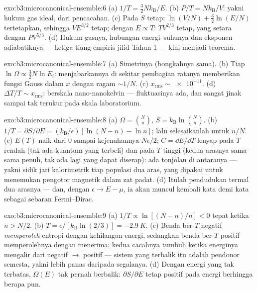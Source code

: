 \begin{solution}{exo:b3:microcanonical-ensemble:6}
(a) $1/T = \tfrac32 Nk_{\text{B}}/E$. (b) $P/T =
Nk_{\text{B}}/V$: yakni hukum gas ideal, dari pencacahan. (c) Pada $S$
tetap: $\ln(V/N) + \tfrac32\ln(E/N)$ tertetapkan, sehingga $VE^{3/2}$
tetap; dengan $E \propto T$: $TV^{2/3}$ tetap, yang setara dengan
$PV^{5/3}$. (d) Hukum gasnya, hubungan energi--suhunya dan eksponen
adiabatiknya --- ketiga tiang empiris jilid Tahun 1 --- kini menjadi
teorema.
\end{solution}

\begin{solution}{exo:b3:microcanonical-ensemble:7}
(a) Simetrinya (bongkahnya sama). (b) Tiap $\ln\Omega \propto
\tfrac32 N\ln E_i$: menjabarkannya di sekitar pembagian ratanya
memberikan fungsi Gauss dalam $x$ dengan ragam $\sim1/N$. (c) $x_{\text{rms}} \sim
\num{e-11}$. (d) $\Delta T/T \sim x_{\text{rms}}$:
berskala nano-nanokelvin --- fluktuasinya ada, dan sangat jinak sampai
tak terukur pada skala laboratorium.
\end{solution}

\begin{solution}{exo:b3:microcanonical-ensemble:8}
(a) $\Omega = \binom Nn$, $S = k_{\text{B}}\ln\binom Nn$. (b)
$1/T = \partial S/\partial E = (k_{\text{B}}/\epsilon)[\ln(N-n) -
\ln n]$; lalu selesaikanlah untuk $n/N$. (c) $E(T)$ naik dari $0$ sampai
kejenuhannya $N\epsilon/2$; $C = \dd E/\dd T$ lenyap pada $T$ rendah
(tak ada kuantum yang terbeli) dan pada $T$ tinggi (kedua arasnya
sama-sama penuh, tak ada lagi yang dapat diserap): ada tonjolan di
antaranya --- yakni sidik jari kalorimetrik tiap populasi dua aras, yang
dipakai untuk menemukan pengotor magnetik dalam zat padat. (d) Itulah
pendudukan termal dua arasnya --- dan, dengan $\epsilon \to E - \mu$, ia
akan muncul kembali kata demi kata sebagai sebaran Fermi--Dirac.
\end{solution}

\begin{solution}{exo:b3:microcanonical-ensemble:9}
(a) $1/T \propto \ln[(N-n)/n] < 0$ tepat ketika $n > N/2$. (b)
$T = \epsilon/[k_{\text{B}}\ln(2/3)] = -\qty{2.9}{K}$. (c) Benda ber-$T$
negatif \emph{memperoleh} entropi dengan kehilangan energi, sedangkan
benda ber-$T$ positif memperolehnya dengan menerima: kedua cacahnya
tumbuh ketika energinya mengalir dari negatif $\to$ positif --- sistem
yang terbalik itu adalah pendonor semesta, yakni lebih panas daripada
segalanya. (d) Dengan energi yang tak terbatas, $\Omega(E)$ tak pernah
berbalik: $\partial S/\partial E$ tetap positif pada energi berhingga
berapa pun.
\end{solution}

